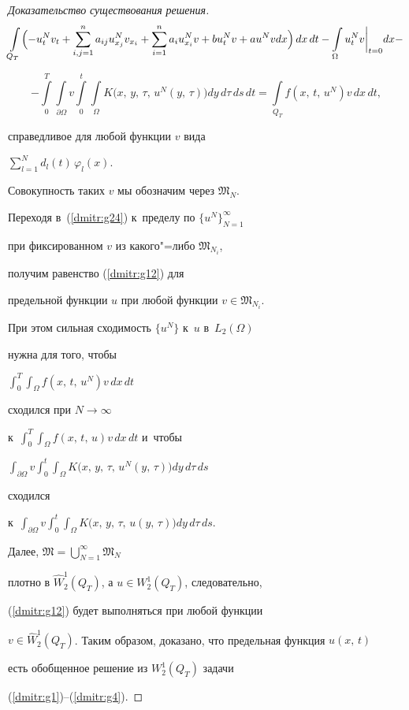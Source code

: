 \begin{proof}[Доказательство\,\,существования\,\,решения]
$$


\int\limits_{Q_T}\Bigl(-u^N_tv_t+


\sum\limits_{i,j=1}^na_{ij}u_{x_j}^Nv_{x_i}+


\sum\limits_{i=1}^{n}a_iu_{x_i}^Nv +bu_t^Nv+au^Nvdx\Bigr)


\,dx\,dt-\int\limits_{\Omega}u_t^Nv\bigg|_{t=0}dx-


$$


\begin{equation}


\label{dmitr:g24}


-\int\limits_0^T\int\limits_{\partial\Omega}v \int\limits_0^t


\int\limits_{\Omega}K\bigl(x,\,y,\,\tau,\,u^N(y,\,\tau)\bigr)dy\,d\tau\,ds \,dt=


\int\limits_{Q_T}f(x,\,t,\,u^N)v\,dx\,dt,


\end{equation}


справедливое для любой функции $v$ вида


$\sum\limits_{l=1}^Nd_l(t)\,\varphi_l(x)$.


Совокупность таких $v$ мы обозначим через $\mathfrak M_N$.


Переходя в~(\ref{dmitr:g24}) к~пределу по $\{u^N\}_{N=1}^{\infty}$


при фиксированном $v$ из какого"=либо $\mathfrak M_{N_i}$,


получим равенство (\ref{dmitr:g12}) для


предельной функции $u$ при любой функции $v\in\mathfrak M_{N_i}$.


При этом сильная сходимость $\{u^N\}$ к~$u$ в~$L_2(\Omega)$


нужна для того, чтобы


$\displaystyle \int_0^T \!\! \int_{\Omega}\!f(x,\, t,\, u^N)v\,dx\,dt$


сходился при \mbox{$N\to\infty$}


к~$\displaystyle \int_0^T\!\! \int_{\Omega}\!f(x,\, t,\, u)v\,dx\,dt$ и~чтобы


$\displaystyle \int_{\partial\Omega}\!v \int_0^t\!\! \int_{\Omega}\!K\bigl(x,\, y,\, \tau,\, u^N(y,\, \tau)\bigr)dy\,d\tau\,ds $


сходился


к~$\displaystyle \int_{\partial\Omega}\!v \int_0^t\!\! \int_{\Omega}\!K\bigl(x,\,y,\,\tau,\,u(y,\,\tau)\bigr)dy\,d\tau\,ds$.








Далее, $\mathfrak  M=\bigcup\limits_{N=1}^{\infty}\mathfrak M_N$


плотно в $\hat W_2^1(Q_T)$, а $u\in W_2^1(Q_T)$, следовательно,


(\ref{dmitr:g12}) будет выполняться при любой функции


$v\in\hat W_2^1(Q_T)$. Таким образом, доказано, что предельная функция $u(x,\,t)$


есть обобщенное решение из $W_2^1(Q_T)$ задачи


(\ref{dmitr:g1})--(\ref{dmitr:g4}).\end{proof}
